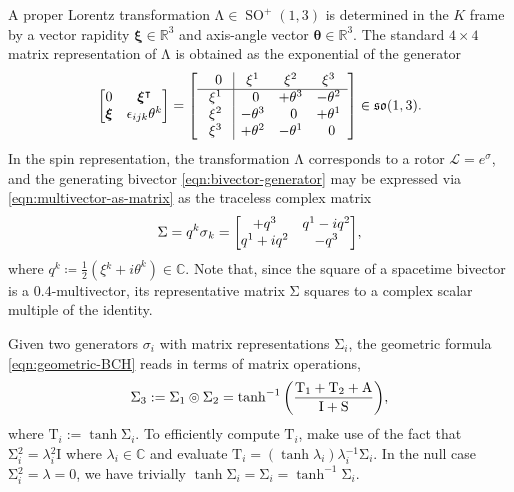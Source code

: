 \documentclass[12pt,a4paper]{article}
\makeatletter
\newcommand\x[1]{\@nameuse{\detokenize{#1}}}
\renewcommand{\vb}[1]{\boldsymbol{#1}}
\newcommand{\rotor}[1]{\mathcal{#1}}
\newcommand{\linmap}[1]{\mathrm{#1}}
\newcommand{\RR}{\mathds{R}}
\newcommand{\CC}{\mathds{C}}
\DeclareMathOperator{\SO}{SO}
\newcommand{\so}{\mathfrak{so}}
\newcommand{\bch}[2]{#1 \circledcirc #2}
\makeatother
\begin{document}
A proper Lorentz transformation $\linmap \Lambda{} \in \SO^+(1,3)$ is determined in the $K$ frame by a vector rapidity $\vb \xi{} \in \RR^3$ and axis-angle vector $\vb \theta \in \RR^3$.
The standard $4\times{}4$ matrix representation of $\linmap \Lambda{}$ is obtained as the exponential of the generator
\newcommand{\zer}{\phantom\pm0\phantom{^i}} %
\begin{align}
	\mqty[
		 0 &  \vb \xi{}^\intercal \\
		\vb \xi{} & \epsilon{}_{ijk}\theta^k
	] =
	\left[\begin{array}{c|ccc}
	\zer & \xi{}^1 & \xi{}^2 & \xi{}^3 \\
	\hline
	\xi{}^1 & \zer & +\theta^3 & -\theta^2 \\
	\xi{}^2 & -\theta^3 & \zer & +\theta^1 \\
	\xi{}^3 & +\theta^2 & -\theta^1 & \zer
	\end{array}\right]
	\in \so(1,3)
	\label{eqn:lorentz-generator-matrix}
.\end{align}
In the spin representation, the transformation $\linmap \Lambda{}$ corresponds to a rotor $\rotor L = e^\sigma{}$, and the generating bivector \eqref{eqn:bivector-generator} may be expressed via \eqref{eqn:multivector-as-matrix} as the traceless complex matrix
\begin{align}
	\linmap \Sigma{} = q^k\sigma{}_k = \mqty[
		+q^3 & q^1 - iq^2 \\
		q^1 + iq^2 & -q^3
	]
	\label{eqn:bivector-as-matrix}
,\end{align}
where $q^k \coloneqq \frac12(\xi{}^k + i\theta^k) \in \CC$.
Note that, since the square of a spacetime bivector is a $\qty{0,4}$-multivector, its representative matrix $\linmap \Sigma{}$ squares to a complex scalar multiple of the identity.

Given two generators $\sigma{}_i$ with matrix representations $\linmap \Sigma{}_i$, the geometric \x{BCH} formula \eqref{eqn:geometric-BCH} reads in terms of matrix operations,
\begin{align}
	\linmap \Sigma{}_3 :={} \bch{\linmap \Sigma{}_1}{\linmap \Sigma{}_2} = \tanh^{-1}\qty(
		\linmap{\frac{ T_1 + T_2 + A }{ I + S }}
	)
	\label{eqn:matrix-BCH}
,\end{align}
where $\linmap T_i :={} \tanh \linmap \Sigma{}_i$.
To efficiently compute $\linmap T_i$, make use of the fact that $\linmap \Sigma{}_i^2 = \lambda{}_i^2\linmap I$ where $\lambda{}_i \in \CC$ and evaluate $\linmap T_i = (\tanh \lambda{}_i)\lambda{}_i^{-1}\linmap \Sigma{}_i$.
In the null case $\linmap \Sigma{}_i^2 = \lambda{} = 0$, we have trivially $\tanh \linmap \Sigma{}_i = \linmap \Sigma{}_i = \tanh^{-1} \linmap \Sigma{}_i$.
\end{document}
